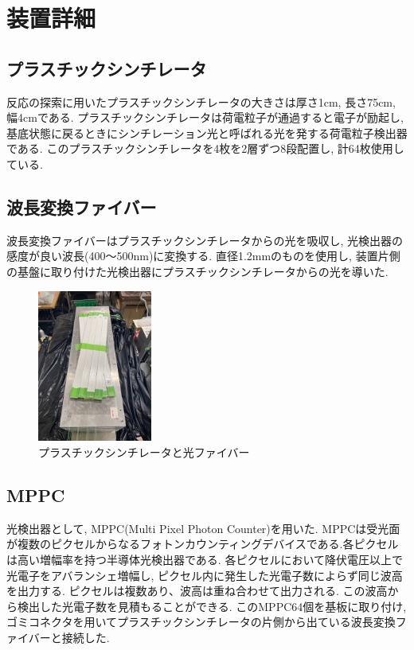 \section{装置詳細}
\subsection{プラスチックシンチレータ}
反応の探索に用いたプラスチックシンチレータの大きさは厚さ1cm, 長さ75cm, 幅4cmである.
プラスチックシンチレータは荷電粒子が通過すると電子が励起し, 基底状態に戻るときにシンチレーション光と呼ばれる光を発する荷電粒子検出器である.
このプラスチックシンチレータを4枚を2層ずつ8段配置し, 計64枚使用している.

\subsection{波長変換ファイバー}
波長変換ファイバーはプラスチックシンチレータからの光を吸収し, 光検出器の感度が良い波長(400～500nm)に変換する.
直径1.2mmのものを使用し, 装置片側の基盤に取り付けた光検出器にプラスチックシンチレータからの光を導いた.

\begin{figure}[H]
    \centering
    \includegraphics[height=5cm]{img/Scinti.jpeg}
    \caption{プラスチックシンチレータと光ファイバー}
    \label{fig:fiber}
\end{figure}

\subsection{MPPC}
光検出器として, MPPC(Multi Pixel Photon Counter)を用いた.
MPPCは受光面が複数のピクセルからなるフォトンカウンティングデバイスである.各ピクセルは高い増幅率を持つ半導体光検出器である.
各ピクセルにおいて降伏電圧以上で光電子をアバランシェ増幅し, ピクセル内に発生した光電子数によらず同じ波高を出力する.
ピクセルは複数あり、波高は重ね合わせて出力される.
この波高から検出した光電子数を見積もることができる.
このMPPC64個を基板に取り付け, ゴミコネクタを用いてプラスチックシンチレータの片側から出ている波長変換ファイバーと接続した.

